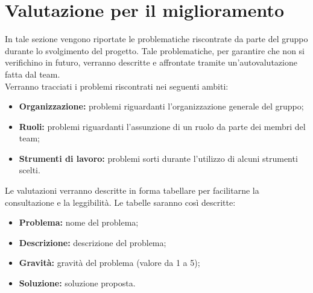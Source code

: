 \section{Valutazione per il miglioramento}
In tale sezione vengono riportate le problematiche riscontrate da parte del gruppo durante lo svolgimento del progetto. Tale problematiche, per garantire che non si verifichino in futuro, verranno descritte e affrontate tramite un'autovalutazione fatta dal team.\\
Verranno tracciati i problemi riscontrati nei seguenti ambiti:
\begin{itemize}
	\item \textbf{Organizzazione:} problemi riguardanti l'organizzazione generale del gruppo;
	\item \textbf{Ruoli:} problemi riguardanti l'assunzione di un ruolo da parte dei membri del team;
	\item \textbf{Strumenti di lavoro:}  problemi sorti durante l'utilizzo di alcuni strumenti scelti.
\end{itemize}
Le valutazioni verranno descritte in forma tabellare per facilitarne la consultazione e la leggibilità. Le tabelle saranno così descritte:
\begin{itemize}
	\item \textbf{Problema:} nome del problema;
	\item \textbf{Descrizione:} descrizione del problema;
	\item \textbf{Gravità:} gravità del problema (valore da 1 a 5);
	\item \textbf{Soluzione:} soluzione proposta.
\end{itemize}




